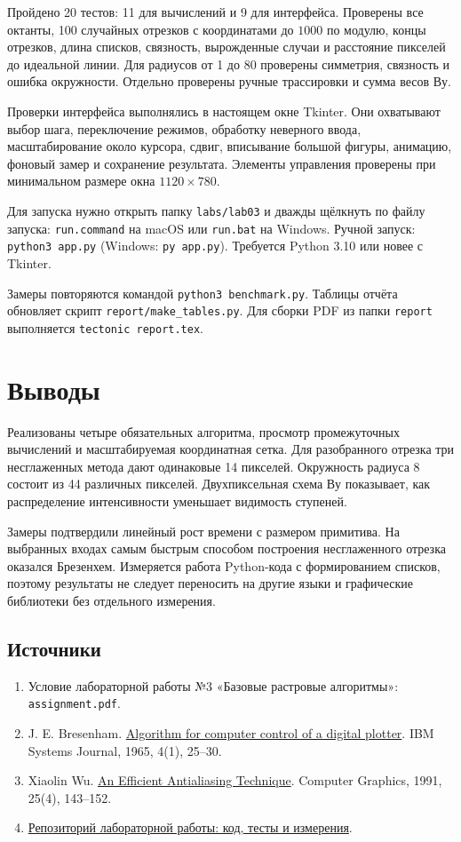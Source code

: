 \documentclass[12pt,a4paper]{extarticle}
\newcommand{\code}[1]{\texttt{\small #1}}
\begin{document}
Пройдено 20 тестов: 11 для вычислений и 9 для интерфейса. Проверены все октанты, 100 случайных отрезков с координатами до $1000$ по модулю, концы отрезков, длина списков, связность, вырожденные случаи и расстояние пикселей до идеальной линии. Для радиусов от 1 до 80 проверены симметрия, связность и ошибка окружности. Отдельно проверены ручные трассировки и сумма весов Ву.

Проверки интерфейса выполнялись в настоящем окне Tkinter. Они охватывают выбор шага, переключение режимов, обработку неверного ввода, масштабирование около курсора, сдвиг, вписывание большой фигуры, анимацию, фоновый замер и сохранение результата. Элементы управления проверены при минимальном размере окна $1120\times780$.

Для запуска нужно открыть папку \code{labs/lab03} и дважды щёлкнуть по файлу запуска: \code{run.command} на macOS или \code{run.bat} на Windows. Ручной запуск: \code{python3 app.py} (Windows: \code{py app.py}). Требуется Python 3.10 или новее с Tkinter.

Замеры повторяются командой \code{python3 benchmark.py}. Таблицы отчёта обновляет скрипт \code{report/make\_tables.py}. Для сборки PDF из папки \code{report} выполняется \code{tectonic report.tex}.

\section{Выводы}
Реализованы четыре обязательных алгоритма, просмотр промежуточных вычислений и масштабируемая координатная сетка. Для разобранного отрезка три несглаженных метода дают одинаковые 14 пикселей. Окружность радиуса 8 состоит из 44 различных пикселей. Двухпиксельная схема Ву показывает, как распределение интенсивности уменьшает видимость ступеней.

Замеры подтвердили линейный рост времени с размером примитива. На выбранных входах самым быстрым способом построения несглаженного отрезка оказался Брезенхем. Измеряется работа Python-кода с формированием списков, поэтому результаты не следует переносить на другие языки и графические библиотеки без отдельного измерения.

\subsection*{Источники}
\begin{enumerate}
\item Условие лабораторной работы №3 «Базовые растровые алгоритмы»: \code{assignment.pdf}.
\item J. E. Bresenham. \href{https://ibm-1401.info/Pics3/bresenham1965.pdf}{Algorithm for computer control of a digital plotter}. IBM Systems Journal, 1965, 4(1), 25--30.
\item Xiaolin Wu. \href{https://cgg.mff.cuni.cz/~pepca/ref/WU.pdf}{An Efficient Antialiasing Technique}. Computer Graphics, 1991, 25(4), 143--152.
\item \href{https://github.com/YauheniShe/bsu-computer-graphics/tree/main/labs/lab03}{Репозиторий лабораторной работы: код, тесты и измерения}.
\end{enumerate}
\end{document}
